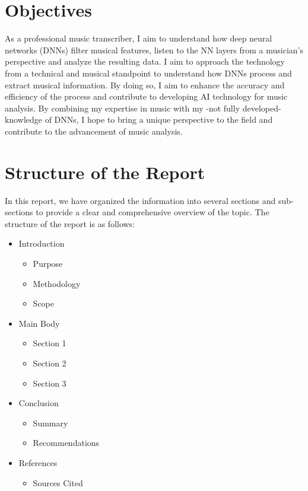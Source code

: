 \section{Objectives}

As a professional music transcriber, I aim to understand how deep neural networks (DNNs) filter musical features, listen to the NN layers from a musician's perspective and analyze the resulting data. I aim to approach the technology from a technical and musical standpoint to understand how DNNs process and extract musical information. By doing so, I aim to enhance the accuracy and efficiency of the process and contribute to developing AI technology for music analysis. By combining my expertise in music with my -not fully developed- knowledge of DNNs, I hope to bring a unique perspective to the field and contribute to the advancement of music analysis.

\section{Structure of the Report}

In this report, we have organized the information into several sections and sub-sections to provide a clear and comprehensive overview of the topic. The structure of the report is as follows:

\begin{itemize}
\item Introduction
  \begin{itemize}
  \item Purpose
  \item Methodology
  \item Scope
  \end{itemize}
\item Main Body
  \begin{itemize}
  \item Section 1
  \item Section 2
  \item Section 3
  \end{itemize}
\item Conclusion
  \begin{itemize}
  \item Summary
  \item Recommendations
  \end{itemize}
\item References
  \begin{itemize}
  \item Sources Cited
  \end{itemize}
\end{itemize}

\newpage


